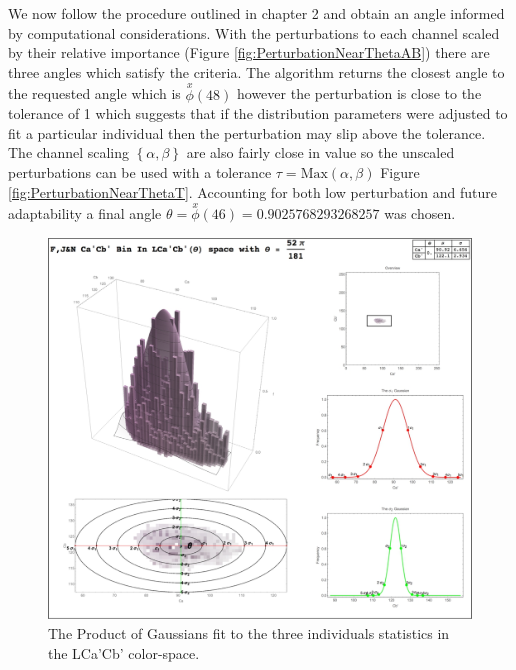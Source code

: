 We now follow the procedure outlined in chapter 2 and obtain an angle informed by computational considerations.  
With the perturbations to each channel scaled by their relative importance (Figure \ref{fig:PerturbationNearThetaAB}) there are three angles which satisfy the criteria.
 The algorithm returns the closest angle to the requested angle which is $\overset{x}{\phi } (48)$ however the perturbation is close to the tolerance of 1 which suggests that if the distribution parameters were adjusted to fit a particular individual then the perturbation may slip above the tolerance. 
 The channel scaling $\left\{ \alpha, \beta\right\} $ are also fairly close in value so the unscaled perturbations can be used with a tolerance $\tau = \text{Max}\left(\alpha, \beta\right)$ Figure \ref{fig:PerturbationNearThetaT}. 
 Accounting for both low perturbation and future adaptability a final angle $\theta = \overset{x}{\phi }(46) = 0.9025768293268257$ was chosen.

\begin{figure}[h!]
  \centering
  \includegraphics[width=1.0 \textwidth]{Chapter3/Figs/Fit_the_Gaussian_Final.jpg} 
    \caption{The Product of Gaussians fit to the three individuals statistics in the LCa'Cb' color-space.  }  \label{fig:FittheGaussianFinal}
\end{figure}

